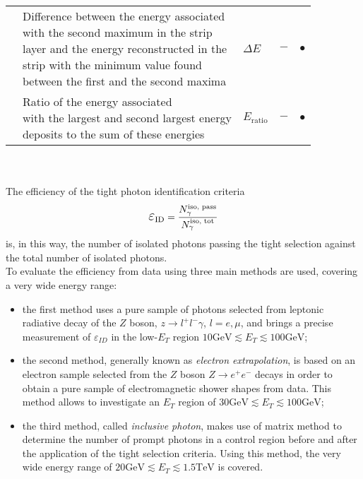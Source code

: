 \begin{table}[t]
\begin{tabular}{l|l|l|l|l}
\cline{2-5}
& \makecell{Difference between the energy associated\\ with the second maximum in the strip\\ layer and the energy reconstructed in the\\ strip with the minimum value found\\ between the first and the second maxima} & $\Delta E$ & $-$ & $\bullet$ \\
\cline{2-5}
& \makecell{Ratio of the energy associated\\ with the largest and second largest energy\\ deposits to the sum of these energies} & $E_{\text{ratio}}$ & $-$ & $\bullet$ \\

\end{tabular}
\end{table}
\\\\The efficiency of the tight photon identification criteria
\begin{equation}
\mathlarger{\mathlarger{\varepsilon}}_{\text{ID}} = \frac{N_{\gamma}^{\text{iso, pass}}}{N_{\gamma}^{\text{iso, tot}}}
\end{equation}
is, in this way, the number of isolated photons passing the tight selection against the total number of isolated photons.
\\
To evaluate the efficiency from data  using three main methods are used, covering a very wide energy range:
\begin{itemize}
\item the first method uses a pure sample of photons selected from leptonic radiative decay of the $Z$ boson, $z \rightarrow l^+l^- \gamma$, $l = e, \mu$, and brings a precise measurement of $\varepsilon_{ID}$ in the low-$E_T$ region $10 \text{GeV} \lesssim E_T \lesssim 100 \text{GeV}$;
\item the second method, generally known as \emph{electron extrapolation}, is based on an electron sample selected from the $Z$ boson $Z \rightarrow e^+e^-$ decays in order to obtain a pure sample of electromagnetic shower shapes from data. This method allows to investigate an $E_T$ region of $30 \text{GeV} \lesssim E_T \lesssim 100 \text{GeV}$;
\item the third method, called \emph{inclusive photon}, makes use of matrix method to determine the number of prompt photons in a control region before and after the application of the tight selection criteria. Using this method, the very wide energy range of $20 \text{GeV} \lesssim E_T \lesssim 1.5 \text{TeV}$ is covered.
\end{itemize}

